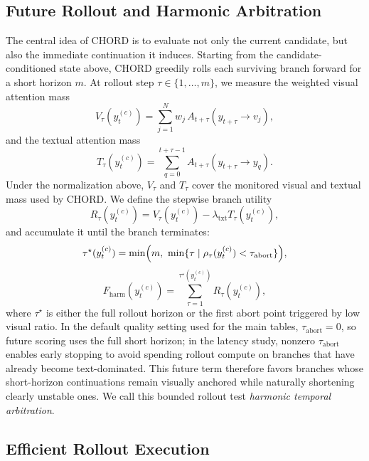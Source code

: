 \documentclass[sigconf,anonymous]{acmart}
\begin{document}
\subsection{Future Rollout and Harmonic Arbitration}
\label{sec:oracle}

The central idea of CHORD is to evaluate not only the current candidate, but also the immediate continuation it induces. Starting from the candidate-conditioned state above, CHORD greedily rolls each surviving branch forward for a short horizon $m$. At rollout step $\tau \in \{1,\dots,m\}$, we measure the weighted visual attention mass
\begin{equation}
    V_\tau(y_t^{(c)}) = \sum_{j=1}^{N} w_j\, A_{t+\tau}(y_{t+\tau} \rightarrow v_j),
\end{equation}
and the textual attention mass
\begin{equation}
    T_\tau(y_t^{(c)}) = \sum_{q=0}^{t+\tau-1} A_{t+\tau}(y_{t+\tau} \rightarrow y_q).
\end{equation}
Under the normalization above, $V_\tau$ and $T_\tau$ cover the monitored visual and textual mass used by CHORD. We define the stepwise branch utility
\begin{equation}
    R_\tau(y_t^{(c)}) = V_\tau(y_t^{(c)}) - \lambda_{\mathrm{txt}} T_\tau(y_t^{(c)}),
\end{equation}
and accumulate it until the branch terminates:
\begin{equation}
    \tau^\star(y_t^{(c)}) = \min \Bigl(m,\ \min \{\tau \mid \rho_\tau(y_t^{(c)}) < \tau_{\mathrm{abort}}\}\Bigr),
\end{equation}
\begin{equation}
    F_{\mathrm{harm}}(y_t^{(c)}) = \sum_{\tau=1}^{\tau^\star(y_t^{(c)})} R_\tau(y_t^{(c)}),
\end{equation}
where $\tau^\star$ is either the full rollout horizon or the first abort point triggered by low visual ratio. In the default quality setting used for the main tables, $\tau_{\mathrm{abort}}=0$, so future scoring uses the full short horizon; in the latency study, nonzero $\tau_{\mathrm{abort}}$ enables early stopping to avoid spending rollout compute on branches that have already become text-dominated. This future term therefore favors branches whose short-horizon continuations remain visually anchored while naturally shortening clearly unstable ones. We call this bounded rollout test \emph{harmonic temporal arbitration}.

\subsection{Efficient Rollout Execution}
\label{sec:bb}
\end{document}
